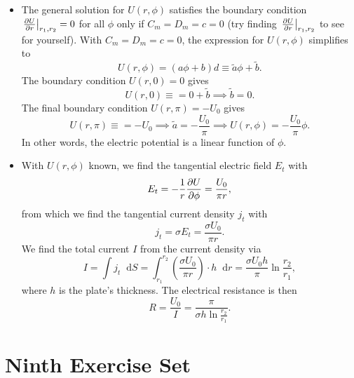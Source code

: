 \documentclass[11pt, a4paper]{article}
\newcommand{\diff}{\mathop{}\!\mathrm{d}} %
\renewcommand{\t}[1]{\tilde{#1}} %
\begin{document}
\begin{itemize}
	\item The general solution for $ U(r, \phi) $ satisfies the boundary condition $ \eval{\pdv{U}{r}}_{r_{1}, r_{2}} = 0 $ for all $ \phi $ only if $ C_{m} = D_{m} = c = 0 $ (try finding $ \eval{\pdv{U}{r}}_{r_{1}, r_{2}}  $ to see for yourself). With $  C_{m} = D_{m} = c = 0 $, the expression for $ U(r, \phi) $ simplifies to
	\begin{equation*}
		U(r, \phi) = (a \phi + b)d \equiv \t{a}\phi + \t{b}.
	\end{equation*}
	The boundary condition $ U(r, 0) = 0 $ gives
	\begin{equation*}
		U(r, 0) \equiv = 0 + \t{b} \implies \t{b} = 0.
	\end{equation*}
	The final boundary condition $ U(r, \pi) = -U_{0} $ gives
	\begin{equation*}
		U(r, \pi) \equiv = - U_{0} \implies \t{a} = -\frac{U_{0}}{\pi} \implies U(r, \phi) = - \frac{U_{0}}{\pi} \phi.
	\end{equation*}
	In other words, the electric potential is a linear function of $ \phi $. 
	
	\item With $ U(r, \phi) $ known, we find the tangential electric field $ E_{t} $ with
	\begin{equation*}
		E_{t} = - \frac{1}{r}\pdv{U}{\phi} = \frac{U_{0}}{\pi r},
	\end{equation*}
	from which we find the tangential current density $ j_{t} $ with
	\begin{equation*}
		j_{t} = \sigma E_{t} = \frac{\sigma U_{0}}{\pi r}.
	\end{equation*}
	We find the total current $ I $ from the current density via
	\begin{equation*}
		I = \int j_{t} \diff S = \int_{r_{1}}^{r_{2}} \left(\frac{\sigma U_{0}}{\pi r}\right) \cdot h \diff r = \frac{\sigma U_{0} h}{\pi} \ln \frac{r_{2}}{r_{1}},
	\end{equation*}
	where $ h $ is the plate's thickness. The electrical resistance is then
	\begin{equation*}
		R = \frac{U_{0}}{I} = \frac{\pi}{\sigma h \ln \frac{r_{2}}{r_{1}}}.
	\end{equation*}
\end{itemize}

\section{Ninth Exercise Set}
\end{document}
